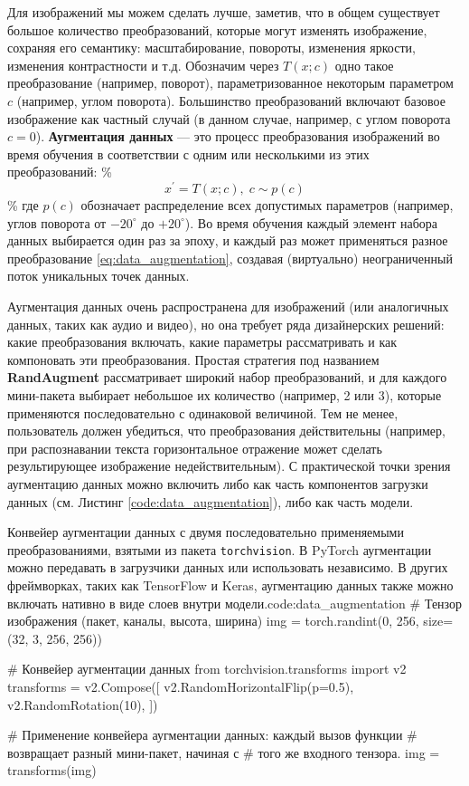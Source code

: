 Для изображений мы можем сделать лучше, заметив, что в общем существует большое количество преобразований, которые могут изменять изображение, сохраняя его семантику: масштабирование, повороты, изменения яркости, изменения контрастности и т.д. Обозначим через $T(x; c)$ одно такое преобразование (например, поворот), параметризованное некоторым параметром $c$ (например, углом поворота). Большинство преобразований включают базовое изображение как частный случай (в данном случае, например, с углом поворота $c=0$). \textbf{Аугментация данных} — это процесс преобразования изображений во время обучения в соответствии с одним или несколькими из этих преобразований:
\%
\begin{equation}
x^\prime=T(x;c),\;c\sim p(c)
\label{eq:data_augmentation}
\end{equation}
\%
где $p(c)$ обозначает распределение всех допустимых параметров (например, углов поворота от $-20^\circ$ до $+20^\circ$). Во время обучения каждый элемент набора данных выбирается один раз за эпоху, и каждый раз может применяться разное преобразование \eqref{eq:data_augmentation}, создавая (виртуально) неограниченный поток уникальных точек данных.

Аугментация данных очень распространена для изображений (или аналогичных данных, таких как аудио и видео), но она требует ряда дизайнерских решений: какие преобразования включать, какие параметры рассматривать и как компоновать эти преобразования. Простая стратегия под названием \textbf{RandAugment} \cite{cubuk2020randaugment} рассматривает широкий набор преобразований, и для каждого мини-пакета выбирает небольшое их количество (например, 2 или 3), которые применяются последовательно с одинаковой величиной. Тем не менее, пользователь должен убедиться, что преобразования действительны (например, при распознавании текста горизонтальное отражение может сделать результирующее изображение недействительным). С практической точки зрения аугментацию данных можно включить либо как часть компонентов загрузки данных (см. Листинг \ref{code:data_augmentation}), либо как часть модели.

\begin{mypy}{Конвейер аугментации данных с двумя последовательно применяемыми преобразованиями, взятыми из пакета {\footnotesize\texttt{torchvision}}. В PyTorch аугментации можно передавать в загрузчики данных или использовать независимо. В других фреймворках, таких как TensorFlow и Keras, аугментацию данных также можно включать нативно в виде слоев внутри модели.}{code:data_augmentation}
# Тензор изображения (пакет, каналы, высота, ширина)
img = torch.randint(0, 256, size=(32, 3, 256, 256))

# Конвейер аугментации данных
from torchvision.transforms import v2
transforms = v2.Compose([
    v2.RandomHorizontalFlip(p=0.5),
    v2.RandomRotation(10),
])

# Применение конвейера аугментации данных: каждый вызов функции
# возвращает разный мини-пакет, начиная с
# того же входного тензора.
img = transforms(img)
\end{mypy}

